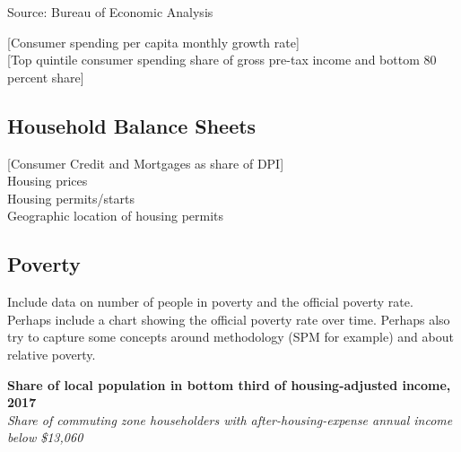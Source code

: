 \documentclass{report}
\begin{document}
{{{\vspace{-6mm}
\footnotesize{Source: Bureau of Economic Analysis}

\newpage 

\begin{minipage}{0.76\textwidth}
\normalsize

[Consumer spending per capita monthly growth rate] \\

[Top quintile consumer spending share of gross pre-tax income and bottom 80 percent share] \\


\subsection*{\color{black!70} \seriffont Household Balance Sheets}

[Consumer Credit and Mortgages as share of DPI] \\

Housing prices \\

Housing permits/starts \\

Geographic location of housing permits \\

\end{minipage}

\newpage

\subsection*{\color{black!70} \seriffont Poverty}

\begin{minipage}{0.76\textwidth}
\small
Include data on number of people in poverty and the official poverty rate. Perhaps include a chart showing the official poverty rate over time. Perhaps also try to capture some concepts around methodology (SPM for example) and about relative poverty.\\

\end{minipage}

\noindent \normalsize \textbf{Share of local population in bottom third of housing-adjusted income, 2017}\\
\footnotesize{\textit{Share of commuting zone householders with after-housing-expense annual income below \$13,060}}

\vspace{-3mm}
\hspace{-15mm} 

}}}
\end{document}
